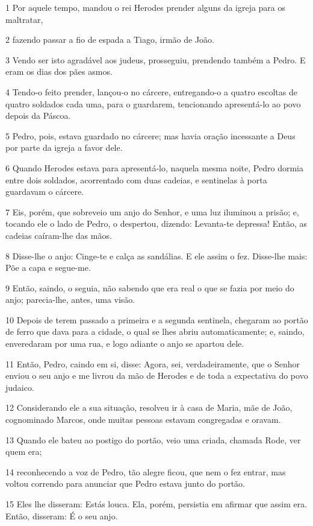 \par 1 Por aquele tempo, mandou o rei Herodes prender alguns da igreja para os maltratar,
\par 2 fazendo passar a fio de espada a Tiago, irmão de João.
\par 3 Vendo ser isto agradável aos judeus, prosseguiu, prendendo também a Pedro. E eram os dias dos pães asmos.
\par 4 Tendo-o feito prender, lançou-o no cárcere, entregando-o a quatro escoltas de quatro soldados cada uma, para o guardarem, tencionando apresentá-lo ao povo depois da Páscoa.
\par 5 Pedro, pois, estava guardado no cárcere; mas havia oração incessante a Deus por parte da igreja a favor dele.
\par 6 Quando Herodes estava para apresentá-lo, naquela mesma noite, Pedro dormia entre dois soldados, acorrentado com duas cadeias, e sentinelas à porta guardavam o cárcere.
\par 7 Eis, porém, que sobreveio um anjo do Senhor, e uma luz iluminou a prisão; e, tocando ele o lado de Pedro, o despertou, dizendo: Levanta-te depressa! Então, as cadeias caíram-lhe das mãos.
\par 8 Disse-lhe o anjo: Cinge-te e calça as sandálias. E ele assim o fez. Disse-lhe mais: Põe a capa e segue-me.
\par 9 Então, saindo, o seguia, não sabendo que era real o que se fazia por meio do anjo; parecia-lhe, antes, uma visão.
\par 10 Depois de terem passado a primeira e a segunda sentinela, chegaram ao portão de ferro que dava para a cidade, o qual se lhes abriu automaticamente; e, saindo, enveredaram por uma rua, e logo adiante o anjo se apartou dele.
\par 11 Então, Pedro, caindo em si, disse: Agora, sei, verdadeiramente, que o Senhor enviou o seu anjo e me livrou da mão de Herodes e de toda a expectativa do povo judaico.
\par 12 Considerando ele a sua situação, resolveu ir à casa de Maria, mãe de João, cognominado Marcos, onde muitas pessoas estavam congregadas e oravam.
\par 13 Quando ele bateu ao postigo do portão, veio uma criada, chamada Rode, ver quem era;
\par 14 reconhecendo a voz de Pedro, tão alegre ficou, que nem o fez entrar, mas voltou correndo para anunciar que Pedro estava junto do portão.
\par 15 Eles lhe disseram: Estás louca. Ela, porém, persistia em afirmar que assim era. Então, disseram: É o seu anjo.
